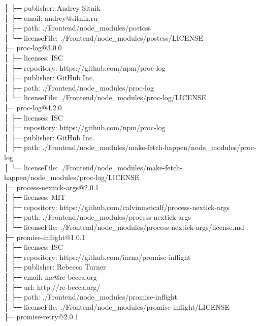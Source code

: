 \documentclass[
    paper=a4,
    twoside=false,
    parskip=half,
    listof=entryprefix,
    listof=totoc,
    index=totoc,
    bibliography=totoc,
    headsepline,
]{scrbook}
\begin{document}
    │  ├─ publisher: Andrey Sitnik\\
    │  ├─ email: andrey@sitnik.ru\\
    │  ├─ path: ./Frontend/node\_modules/postcss\\
    │  └─ licenseFile: ./Frontend/node\_modules/postcss/LICENSE\\
    ├─ proc-log@3.0.0\\
    │  ├─ licenses: ISC\\
    │  ├─ repository: https://github.com/npm/proc-log\\
    │  ├─ publisher: GitHub Inc.\\
    │  ├─ path: ./Frontend/node\_modules/proc-log\\
    │  └─ licenseFile: ./Frontend/node\_modules/proc-log/LICENSE\\
    ├─ proc-log@4.2.0\\
    │  ├─ licenses: ISC\\
    │  ├─ repository: https://github.com/npm/proc-log\\
    │  ├─ publisher: GitHub Inc.\\
    │  ├─ path: ./Frontend/node\_modules/make-fetch-happen/node\_modules/proc-log\\
    │  └─ licenseFile: ./Frontend/node\_modules/make-fetch-happen/node\_modules/proc-log/LICENSE\\
    ├─ process-nextick-args@2.0.1\\
    │  ├─ licenses: MIT\\
    │  ├─ repository: https://github.com/calvinmetcalf/process-nextick-args\\
    │  ├─ path: ./Frontend/node\_modules/process-nextick-args\\
    │  └─ licenseFile: ./Frontend/node\_modules/process-nextick-args/license.md\\
    ├─ promise-inflight@1.0.1\\
    │  ├─ licenses: ISC\\
    │  ├─ repository: https://github.com/iarna/promise-inflight\\
    │  ├─ publisher: Rebecca Turner\\
    │  ├─ email: me@re-becca.org\\
    │  ├─ url: http://re-becca.org/\\
    │  ├─ path: ./Frontend/node\_modules/promise-inflight\\
    │  └─ licenseFile: ./Frontend/node\_modules/promise-inflight/LICENSE\\
    ├─ promise-retry@2.0.1\\
\end{document}
